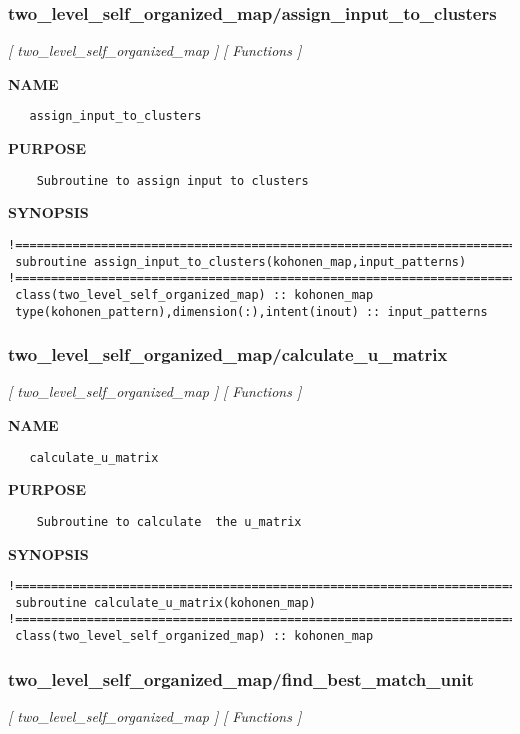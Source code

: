 \documentclass{article}
\begin{document}
\subsubsection{two\_level\_self\_organized\_map/assign\_input\_to\_clusters}
\textsl{[ two\_level\_self\_organized\_map ]}
\textsl{[ Functions ]}

\label{ch:robo57}
\label{ch:two_level_self_organized_map_assign_input_to_clusters}
\textbf{NAME}
\begin{verbatim}
   assign_input_to_clusters
\end{verbatim}
\textbf{PURPOSE}
\begin{verbatim}
    Subroutine to assign input to clusters
\end{verbatim}
\textbf{SYNOPSIS}
\begin{verbatim}
!======================================================================================== 
 subroutine assign_input_to_clusters(kohonen_map,input_patterns)
!========================================================================================
 class(two_level_self_organized_map) :: kohonen_map
 type(kohonen_pattern),dimension(:),intent(inout) :: input_patterns
\end{verbatim}
\newpage
\subsubsection{two\_level\_self\_organized\_map/calculate\_u\_matrix}
\textsl{[ two\_level\_self\_organized\_map ]}
\textsl{[ Functions ]}

\label{ch:robo58}
\label{ch:two_level_self_organized_map_calculate_u_matrix}
\textbf{NAME}
\begin{verbatim}
   calculate_u_matrix
\end{verbatim}
\textbf{PURPOSE}
\begin{verbatim}
    Subroutine to calculate  the u_matrix
\end{verbatim}
\textbf{SYNOPSIS}
\begin{verbatim}
!========================================================================================
 subroutine calculate_u_matrix(kohonen_map)
!========================================================================================
 class(two_level_self_organized_map) :: kohonen_map
\end{verbatim}
\newpage
\subsubsection{two\_level\_self\_organized\_map/find\_best\_match\_unit}
\textsl{[ two\_level\_self\_organized\_map ]}
\textsl{[ Functions ]}
\end{document}
